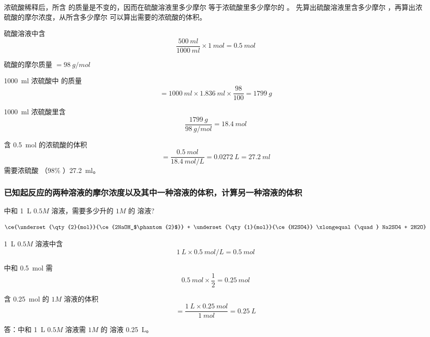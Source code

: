 浓硫酸稀释后，所含  的质量是不变的，因而在硫酸溶液里多少摩尔   等于浓硫酸里多少摩尔的 。 
先算出硫酸溶液里含多少摩尔 ，再算出浓硫酸的摩尔浓度，从所含多少摩尔  可以算出需要的浓硫酸的体积。
\begin{solution}
硫酸溶液中含 
\[ \frac{\qty{500}{ml}}{\qty{1000}{ml}}\times \qty{1}{mol} =\qty{0.5}{mol} \]

硫酸的摩尔质量 $=\qty{98}{g/mol}$

\qty{1000}{ml} 浓硫酸中  的质量
\[ = \qty{1000}{ml} \times \qty{1.836}{ml} \times \frac{98}{100} = \qty{1799}{g}\]

\qty{1000}{ml} 浓硫酸里含 
\[ \frac{\qty{1799}{g}}{\qty{98}{g/mol}}=\qty{18.4}{mol} \]

含 \qty{0.5}{mol}  的浓硫酸的体积
\[ = \frac{\qty{0.5}{mol}}{\qty{18.4}{mol/L}}=\qty{0.0272}{L}=\qty{27.2}{ml} \]
需要浓硫酸 （98\% ）\qty{27.2}{ml}。
\end{solution}

\subsubsection{已知起反应的两种溶液的摩尔浓度以及其中一种溶液的体积，计算另一种溶液的体积}
\begin{example}
  中和 \qty{1}{L} $0.5M$  溶液，需要多少升的 $1M$ 的  溶液?
\end{example}
\begin{solution}
  \[ \ce{\underset{\qty{2}{mol}}{\ce{2NaOH_$\phantom{2}$}} + \underset{\qty{1}{mol}}{\ce{H2SO4}} \xlongequal{\quad} Na2SO4 + 2H2O} \]

  \qty{1}{L} $0.5M$ 溶液中含 
  \[ \qty{1}{L} \times \qty{0.5}{mol/L} = \qty{0.5}{mol}\]

中和 \qty{0.5}{mol}  需 
\[ \qty{0.5}{mol}\times\frac{1}{2}=\qty{0.25}{mol} \]

含 \qty{0.25}{mol} 的 $1M$  溶液的体积
\[= \frac{\qty{1}{L} \times \qty{0.25}{mol}}{\qty{1}{mol}} = \qty{0.25}{L}\]

答：中和 \qty{1}{L} $0.5M$  溶液需 $1M$ 的  溶液 \qty{0.25}{L}。
\end{solution}

